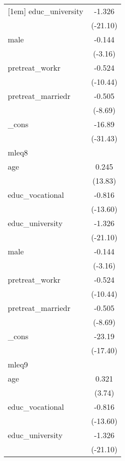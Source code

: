 {\begin{tabular}{l*{1}{c}}
[1em]
educ\_university&      -1.326\sym{***}\\
            &    (-21.10)         \\
[1em]
male        &      -0.144\sym{**} \\
            &     (-3.16)         \\
[1em]
pretreat\_workr&      -0.524\sym{***}\\
            &    (-10.44)         \\
[1em]
pretreat\_marriedr&      -0.505\sym{***}\\
            &     (-8.69)         \\
[1em]
\_cons      &      -16.89\sym{***}\\
            &    (-31.43)         \\
\hline
mleq8       &                     \\
age         &       0.245\sym{***}\\
            &     (13.83)         \\
[1em]
educ\_vocational&      -0.816\sym{***}\\
            &    (-13.60)         \\
[1em]
educ\_university&      -1.326\sym{***}\\
            &    (-21.10)         \\
[1em]
male        &      -0.144\sym{**} \\
            &     (-3.16)         \\
[1em]
pretreat\_workr&      -0.524\sym{***}\\
            &    (-10.44)         \\
[1em]
pretreat\_marriedr&      -0.505\sym{***}\\
            &     (-8.69)         \\
[1em]
\_cons      &      -23.19\sym{***}\\
            &    (-17.40)         \\
\hline
mleq9       &                     \\
age         &       0.321\sym{***}\\
            &      (3.74)         \\
[1em]
educ\_vocational&      -0.816\sym{***}\\
            &    (-13.60)         \\
[1em]
educ\_university&      -1.326\sym{***}\\
            &    (-21.10)         \\
[1em]

\end{tabular}}

